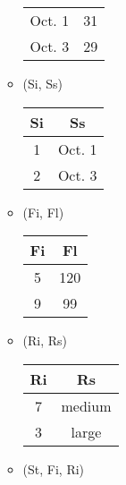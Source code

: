 \documentclass[12pt]{article}
\begin{document}
\begin{enumerate}
\begin{itemize}
\begin{center}
\begin{tabular}{c c}
                    \hline
                    Oct. 1 & 31 \\
                    Oct. 3 & 29 \\
                    \hline                    
                  \end{tabular}
                \end{center}
          \item (Si, Ss)
                \begin{center}
                  \begin{tabular}{c c}
                    \hline
                    Si & Ss \\
                    \hline
                    1  & Oct. 1 \\
                    2  & Oct. 3 \\
                    \hline
                  \end{tabular}
                \end{center}
          \item (Fi, Fl)
                \begin{center}
                  \begin{tabular}{c c}
                    \hline
                    Fi & Fl \\
                    \hline
                    5  & 120 \\
                    9  & 99 \\
                    \hline                    
                  \end{tabular}
                \end{center}
          \item (Ri, Rs)
                \begin{center}
                  \begin{tabular}{c c }
                    \hline
                    Ri & Rs \\
                    \hline
                    7  & medium \\
                    3  & large \\
                    \hline
                  \end{tabular}
                \end{center}      
          \item (St, Fi, Ri)
                \begin{center}
                  \begin{tabular}{c c c}
                    \hline

\end{tabular}
\end{center}
\end{itemize}
\end{enumerate}
\end{document}
